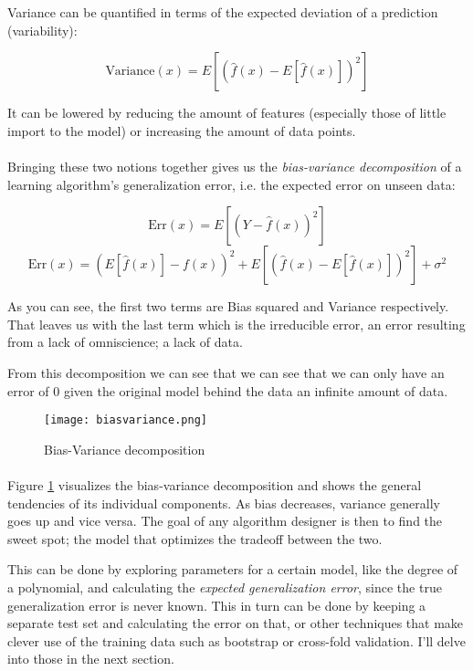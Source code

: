Variance can be quantified in terms of
the expected deviation of a prediction (variability):

$$
\text{Variance}(x) = E[ (\hat{f}(x) - E[\hat{f}(x)])^2]
$$

It can be lowered by
reducing the amount of features
(especially those of little import to the model)
or increasing the amount of data points.

\paragraph{}
Bringing these two notions together
gives us the \textit{bias-variance decomposition}
of a learning algorithm's generalization error,
i.e. the expected error on unseen data:

$$
\text{Err}(x) = E[(Y - \hat{f}(x))^2]
$$
$$
\text{Err}(x) = (E[\hat{f} (x)] - f(x))^2 + E[ (\hat{f}(x) - E[\hat{f}(x)])^2] + \sigma^2
$$

As you can see, the first two terms
are Bias squared and Variance respectively.
That leaves us with the last term
which is the irreducible error,
an error resulting from a lack of
omniscience; a lack of data.

From this decomposition we can see that we
can see that we can only have an error of 0
given the original model behind the data
an infinite amount of data. %

\begin{figure}[ht]
\center
\texttt{[image: biasvariance.png]}

\caption{Bias-Variance decomposition}
\label{fig:biasvariance}
\end{figure}

\paragraph{}
Figure \ref{fig:biasvariance}
visualizes the bias-variance decomposition
and shows the general tendencies of its individual components.
As bias decreases, variance generally goes up
and vice versa.
The goal of any algorithm designer
is then to find the sweet spot;
the model that optimizes the tradeoff
between the two.

This can be done by exploring parameters
for a certain model,
like the degree of a polynomial,
and calculating the
\textit{expected generalization error}, %
since the true generalization error
is never known.
This in turn can be done
by keeping a separate test set
and calculating the error on that,
or other techniques that make clever use
of the training data
such as bootstrap or cross-fold validation.
I'll delve into those in the next section. %

